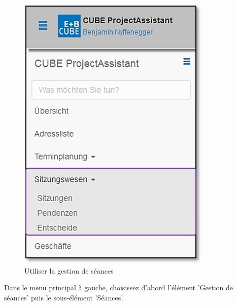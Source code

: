 \begin{figure}   %
  \vspace{-35pt}      %
  \begin{center}
    \includegraphics[width=1\linewidth]{../chapters/05_Sitzungswesen/pictures/5-1_Menu_Sitzungswesen.jpg}
  \end{center}
  \vspace{-20pt}
  \caption{Utiliser la gestion de séances}
  \vspace{-10pt}
\end{figure}

Dans le menu principal à gauche, choisissez d'abord l'élément 'Gestion de séances' puis le sous-élément 'Séances'.

